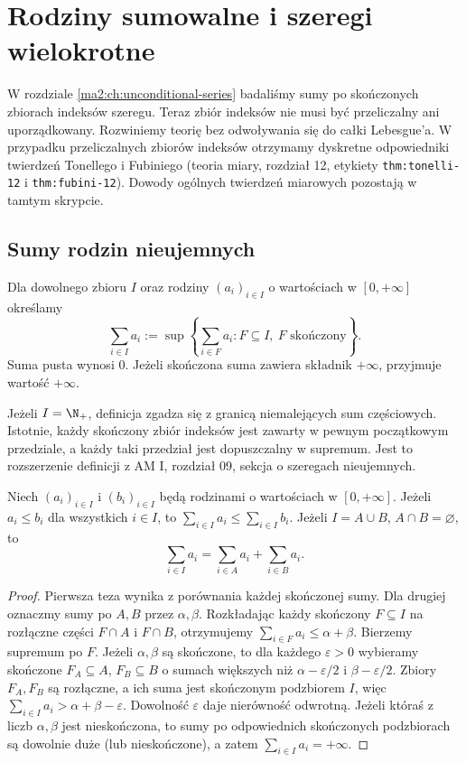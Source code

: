 \chapter{Rodziny sumowalne i szeregi wielokrotne}
\label{ma2:ch:summable-families}

W rozdziale \ref{ma2:ch:unconditional-series} badaliśmy
sumy po skończonych zbiorach indeksów szeregu. Teraz
zbiór indeksów nie musi być przeliczalny ani uporządkowany.
Rozwiniemy teorię bez odwoływania się do całki Lebesgue'a.
W przypadku przeliczalnych zbiorów indeksów otrzymamy
dyskretne odpowiedniki twierdzeń Tonellego i Fubiniego
(teoria miary, rozdział 12, etykiety
\texttt{thm:tonelli-12} i \texttt{thm:fubini-12}).
Dowody ogólnych twierdzeń miarowych pozostają w tamtym skrypcie.

\section{Sumy rodzin nieujemnych}

\begin{definicja}
\label{ma2:def:positive-family}
Dla dowolnego zbioru $I$ oraz rodziny
$(a_i)_{i\in I}$ o wartościach w $[0,+\infty]$ określamy
\[
 \sum_{i\in I}a_i
 :=\sup\left\{\sum_{i\in F}a_i:
                 F\subseteq I,\ F\text{ skończony}\right\}.
\]
Suma pusta wynosi $0$. Jeżeli skończona suma zawiera
składnik $+\infty$, przyjmuje wartość $+\infty$.
\end{definicja}
Jeżeli $I=\N_+$, definicja zgadza się z granicą
niemalejących sum częściowych. Istotnie, każdy skończony
zbiór indeksów jest zawarty w pewnym początkowym
przedziale, a każdy taki przedział jest dopuszczalny
w supremum. Jest to rozszerzenie definicji z AM I,
rozdział 09, sekcja o szeregach nieujemnych.

\begin{lemat}
\label{ma2:lem:positive-family-partition}
Niech $(a_i)_{i\in I}$ i $(b_i)_{i\in I}$ będą rodzinami
o wartościach w $[0,+\infty]$.
Jeżeli $a_i\le b_i$ dla wszystkich $i\in I$, to
$\sum_{i\in I}a_i\le\sum_{i\in I}b_i$.
Jeżeli $I=A\cup B$, $A\cap B=\varnothing$, to
\[
 \sum_{i\in I}a_i=\sum_{i\in A}a_i+\sum_{i\in B}a_i.
\]
\end{lemat}
\begin{proof}
Pierwsza teza wynika z porównania każdej skończonej sumy.
Dla drugiej oznaczmy sumy po $A,B$ przez $\alpha,\beta$.
Rozkładając każdy skończony $F\subseteq I$ na rozłączne
części $F\cap A$ i $F\cap B$, otrzymujemy
$\sum_{i\in F}a_i\le\alpha+\beta$. Bierzemy supremum po $F$.
Jeżeli $\alpha,\beta$ są skończone, to dla każdego
$\varepsilon>0$ wybieramy skończone $F_A\subseteq A$,
$F_B\subseteq B$ o sumach większych niż
$\alpha-\varepsilon/2$ i $\beta-\varepsilon/2$.
Zbiory $F_A,F_B$ są rozłączne, a ich suma jest
skończonym podzbiorem $I$, więc
$\sum_{i\in I}a_i>\alpha+\beta-\varepsilon$.
Dowolność $\varepsilon$ daje nierówność odwrotną.
Jeżeli któraś z liczb $\alpha,\beta$ jest nieskończona,
to sumy po odpowiednich skończonych podzbiorach
są dowolnie duże (lub nieskończone), a zatem
$\sum_{i\in I}a_i=+\infty$.
\end{proof}

